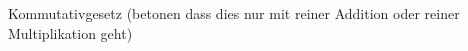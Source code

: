 \documentclass[../../main.tex]{subfiles}
\begin{document}
    Kommutativgesetz (betonen dass dies nur mit reiner Addition oder reiner Multiplikation geht)
\end{document}
